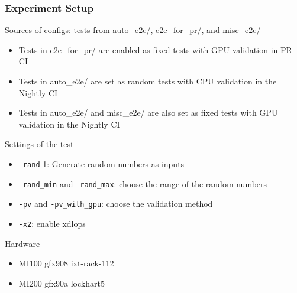\documentclass[t, pdftex, aspectratio=169]{beamer}  %
\begin{document}
\begin{frame}
  \frametitle{Experiment Setup}

  Sources of configs: tests from auto\_e2e/, e2e\_for\_pr/, and misc\_e2e/
  \begin{itemize}
  \item Tests in e2e\_for\_pr/ are enabled as fixed tests with GPU validation in PR CI
  \item Tests in auto\_e2e/ are set as random tests with CPU validation in the Nightly CI
  \item Tests in auto\_e2e/ and misc\_e2e/ are also set as fixed tests with GPU validation in the Nightly CI
  \end{itemize}

  Settings of the test
  \begin{itemize}
  \item \texttt{-rand} 1: Generate random numbers as inputs
  \item \texttt{-rand\_min} and \texttt{-rand\_max}: choose the range of the random numbers
  \item \texttt{-pv} and \texttt{-pv\_with\_gpu}: choose the validation method
  \item \texttt{-x2}: enable xdlops
  \end{itemize}

  Hardware
  \begin{itemize}
  \item MI100 gfx908 ixt-rack-112
  \item MI200 gfx90a lockhart5
  \end{itemize}
\end{frame}
\end{document}
